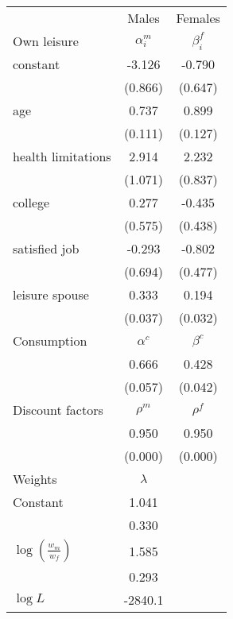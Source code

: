 \begin{tabular}{lcc} 
\hline\hline 
 & Males & Females \\ 
Own leisure & $\alpha_{i}^{m}$ & $\beta_{i}^{f}$ \\ 
constant & -3.126 & -0.790 \\ 
 & (0.866) & (0.647) \\ 
age & 0.737 & 0.899 \\ 
 & (0.111) & (0.127) \\ 
health limitations & 2.914 & 2.232 \\ 
 & (1.071) & (0.837) \\ 
college & 0.277 & -0.435 \\ 
 & (0.575) & (0.438) \\ 
satisfied job & -0.293 & -0.802 \\ 
 & (0.694) & (0.477) \\ 
leisure spouse & 0.333 & 0.194 \\ 
 & (0.037) & (0.032) \\ 
Consumption & $\alpha^{c}$ & $\beta^{c}$ \\ 
 & 0.666 & 0.428 \\ 
 & (0.057) & (0.042) \\ 
Discount factors & $\rho^m$ & $\rho^f$ \\ 
 & 0.950 & 0.950 \\ 
 & (0.000) & (0.000) \\ 
Weights & $\lambda$ &  \\ 
Constant & 1.041 &  \\ 
 & 0.330 &  \\ 
$\log(\frac{w_m}{w_f})$ & 1.585 &  \\ 
 & 0.293 &  \\ 
\hline 
$\log L$ & -2840.1 & \\ 
\hline \hline 
\end{tabular} 
